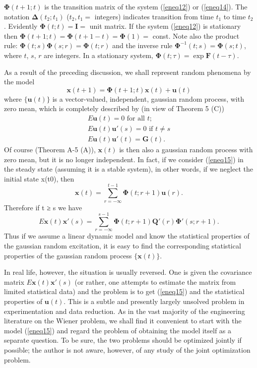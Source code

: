 \documentclass{article}
\newcommand{\vect}[1]{\mathbf{#1}}
\newcommand{\boldPhi}{\boldsymbol{\Phi}}
\newcommand{\boldDelta}{\boldsymbol{\Delta}}
\begin{document}
$\boldPhi(t + 1; t)$ is the transition matrix of the system (\ref{eneq12}) or (\ref{eneq14}). The notation $\boldDelta(t_2; t_1)$ ($t_2, t_1 =$ integers) indicates transition from time $t_1$ to time $t_2$. Evidently $\boldPhi(t; t) = \vect{I} =$ unit matrix. If the system (\ref{eneq12}) is stationary then $\boldPhi(t + 1; t) = \boldPhi(t + 1 - t) = \boldPhi(1) =$ const. Note also the product rule: $\boldPhi(t; s)\boldPhi(s; r) = \boldPhi(t; r)$ and the inverse rule $\boldPhi^{-1}(t; s) = \boldPhi(s; t)$, where $t$, $s$, $r$ are integers. In a stationary system, $\boldPhi(t; τ) = \exp \vect{F}(t - τ)$.

As a result of the preceding discussion, we shall represent random phenomena by the model
\begin{equation}
\label{eneq15}
\mathbf{x}(t+1)=\boldPhi(t+1;t)\mathbf{x}(t)+\mathbf{u}(t)
\end{equation}
where $\{\vect{u}(t)\}$ is a vector-valued, independent, gaussian random process, with zero mean, which is completely described by (in view of Theorem 5 (C))
\begin{align*}
E\mathbf{u}(t)=0 \text{ for all } t;\\
E\mathbf{u}(t)\mathbf{u'}(s)=0 \text{ if } t \ne s\\
E\mathbf{u}(t)\mathbf{u'}(t)=\mathbf{G}(t).
\end{align*}
Of course (Theorem A-5 (A)), $\vect{x}(t)$ is then also a gaussian random process with zero mean, but it is no longer independent. In fact, if we consider (\ref{eneq15}) in the steady state (assuming it is a stable system), in other words, if we neglect the initial state x(t0), then
\begin{equation*}
\mathbf{x}(t)=\sum^{t-1}_{r=-\infty}\boldPhi(t;r+1)\mathbf{u}(r).
\end{equation*}
Therefore if t ≥ s we have
\begin{equation*}
E\mathbf{x}(t)\mathbf{x'}(s)=\sum^{s-1}_{r=-\infty}\boldPhi(t;r+1)\mathbf{Q'}(r)\boldsymbol{\Phi'}(s;r+1).
\end{equation*}
Thus if we assume a linear dynamic model and know the statistical properties of the gaussian random excitation, it is easy to find the corresponding statistical properties of the gaussian random process $\{\vect{x}(t)\}$.

In real life, however, the situation is usually reversed. One is given the covariance matrix $E\vect{x}(t)\vect{x'}(s)$ (or rather, one attempts to estimate the matrix from limited statistical data) and the problem is to get (\ref{eneq15}) and the statistical properties of $\vect{u}(t)$. This is a subtle and presently largely unsolved problem in experimentation and data reduction. As in the vast majority of the engineering literature on the Wiener problem, we shall find it convenient to start with the model (\ref{eneq15}) and regard the problem of obtaining the model itself as a separate question. To be sure, the two problems should be optimized jointly if possible; the author is not aware, however, of any study of the joint optimization problem.
\end{document}
